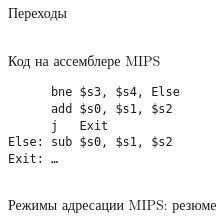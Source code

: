 \begin{frame}[fragile]{Переходы}
\begin{columns}
\pause
\begin{block}{Код на ассемблере MIPS}
\begin{verbatim}
      bne $s3, $s4, Else
      add $s0, $s1, $s2
      j   Exit
Else: sub $s0, $s1, $s2
Exit: …\end{verbatim}
\end{block}
\end{columns}
\end{frame}

\begin{frame}[plain]{Режимы адресации MIPS: резюме}
\vspace{-.1cm}
\end{frame}


